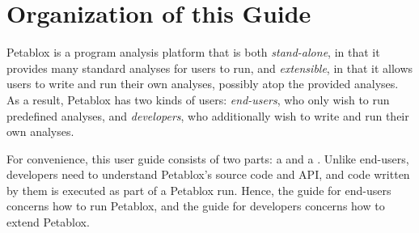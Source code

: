 \chapter{Organization of this Guide}
\label{chap:organization}

Petablox is a program analysis platform that is both {\it stand-alone}, in that it
provides many standard analyses for users to run, and {\it extensible}, in that
it allows users to write and run their own analyses, possibly atop the provided
analyses.  As a result, Petablox has two kinds of users: {\it end-users}, who only
wish to run predefined analyses, and {\it developers}, who additionally wish to
write and run their own analyses.

For convenience, this user guide consists of two parts: a
 and a
.  Unlike end-users,
developers need to understand Petablox's source code and API, and code written by
them is executed as part of a Petablox run.  Hence, the guide for end-users
concerns how to run Petablox, and the guide for developers concerns how to extend
Petablox.

